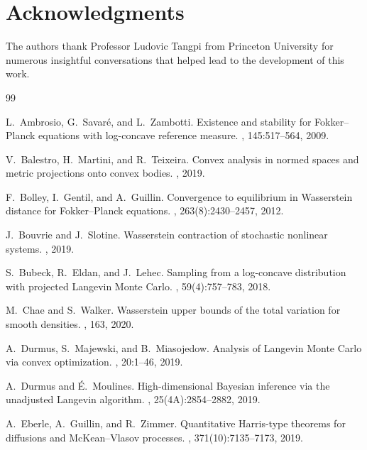 \documentclass[amsfonts, reqno]{amsart}
\theoremstyle{definition}
\theoremstyle{remark}
\numberwithin{equation}{section}
\begin{document}
\newpage

\section*{Acknowledgments}
The authors thank Professor Ludovic Tangpi from Princeton University for numerous insightful conversations that helped lead to the development of this work.

\begin{thebibliography}{99}

L.~Ambrosio, G.~Savaré, and L.~Zambotti.
\newblock Existence and stability for Fokker--Planck equations with log-concave reference measure.
, 145:517--564, 2009.

V.~Balestro, H.~Martini, and R.~Teixeira.
\newblock Convex analysis in normed spaces and metric projections onto convex bodies.
, 2019.

F.~Bolley, I.~Gentil, and A.~Guillin.
\newblock Convergence to equilibrium in Wasserstein distance for Fokker--Planck equations.
, 263(8):2430--2457, 2012.

J.~Bouvrie and J.~Slotine.
\newblock Wasserstein contraction of stochastic nonlinear systems.
, 2019.

S.~Bubeck, R.~Eldan, and J.~Lehec.
\newblock Sampling from a log-concave distribution with projected Langevin Monte Carlo.
, 59(4):757--783, 2018.

M.~Chae and S.~Walker.
\newblock Wasserstein upper bounds of the total variation for smooth densities.
, 163, 2020.

A.~Durmus, S.~Majewski, and B.~Miasojedow.
\newblock Analysis of Langevin Monte Carlo via convex optimization.
, 20:1--46, 2019.

A.~Durmus and É.~Moulines.
\newblock High-dimensional Bayesian inference via the unadjusted Langevin algorithm.
, 25(4A):2854--2882, 2019.

A.~Eberle, A.~Guillin, and R.~Zimmer.
\newblock Quantitative Harris-type theorems for diffusions and McKean--Vlasov processes.
, 371(10):7135--7173, 2019.


\end{thebibliography}
\end{document}
